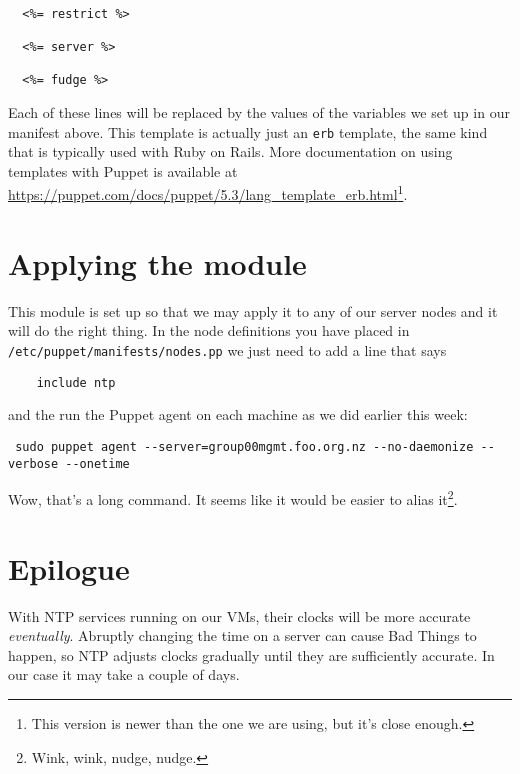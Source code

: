 \documentclass{article}   	%
\begin{document}
\begin{verbatim}

  <%= restrict %>

  <%= server %>

  <%= fudge %>

\end{verbatim}

Each of these lines will be replaced by the values of the variables we set up in our manifest above. This template is actually just an \texttt{erb} template, the same kind that is typically used with Ruby on Rails. More documentation on using templates with Puppet is available at \url{https://puppet.com/docs/puppet/5.3/lang_template_erb.html}\footnote{This version is newer than the one we are using, but it's close enough.}.


\section{Applying the module}
This module is set up so that we may apply it to any of our server nodes and it will do the right thing. In the node definitions you have placed in \texttt{/etc/puppet/manifests/nodes.pp} we just need to add a line that says

\begin{verbatim}
    include ntp
\end{verbatim}

and the run the Puppet agent on each machine as we did earlier this week:

\begin{verbatim}
 sudo puppet agent --server=group00mgmt.foo.org.nz --no-daemonize --verbose --onetime
\end{verbatim}

Wow, that's a long command. It seems like it would be easier to alias it\footnote{Wink, wink, nudge, nudge.}.

\section{Epilogue}
With NTP services running on our VMs, their clocks will be more accurate \emph{eventually}. Abruptly changing the time on a server can cause Bad Things to happen, so NTP adjusts clocks gradually until they are sufficiently accurate. In our case it may take a couple of days.
\end{document}
